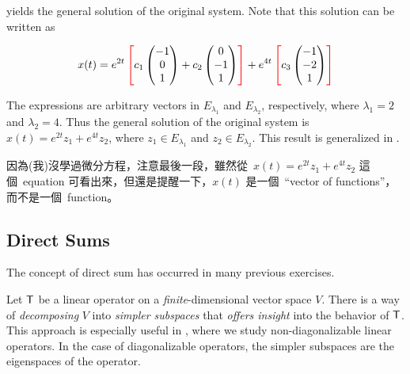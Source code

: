 yields the general solution of the original system.
Note that this solution can be written as

\begin{align*}
    x(t) = e^{2 t} \cleft[red][
        c_{1}\begin{pmatrix} -1 \\ 0 \\ 1 \end{pmatrix}
        + c_{2} \begin{pmatrix} 0 \\ -1 \\ 1 \end{pmatrix}
    \cright[red]]
    + e^{4 t} \cleft[red][
        c_{3} \begin{pmatrix} -1 \\ -2 \\ 1 \end{pmatrix}
    \cright[red]]
\end{align*}

The expressions \emph{} are arbitrary vectors in \(E_{\lambda_1}\) and \(E_{\lambda_2}\), respectively,
where \(\lambda_1 = 2\) and \(\lambda_2 = 4\).
Thus the general solution of the original system is \(x(t) = e^{2t} z_1 + e^{4t} z_2\),
where \(z_1 \in E_{\lambda_1}\) and \(z_2 \in E_{\lambda_2}\).
This result is generalized in .

\begin{note}
因為(我)沒學過微分方程，注意最後一段，雖然從\ \(x(t) = e^{2t} z_1 + e^{4t} z_2\) 這個\ equation 可看出來，但還是提醒一下，\(x(t)\) 是一個\ ``vector of functions''，而不是一個\ function。
\end{note}

\subsection{Direct Sums} \label{sec 5.2.3}

\begin{note}
The concept of direct sum has occurred in many previous exercises.
\end{note}

Let \(\textsf{T}\) be a linear operator on a \emph{finite}-dimensional vector space \(V\).
There is a way of \emph{decomposing} \(V\) into \emph{simpler subspaces} that \emph{offers insight} into the behavior of \(\textsf{T}\).
This approach is especially useful in , where we study non-diagonalizable linear operators.
In the case of diagonalizable operators, the simpler subspaces are the eigenspaces of the operator.

